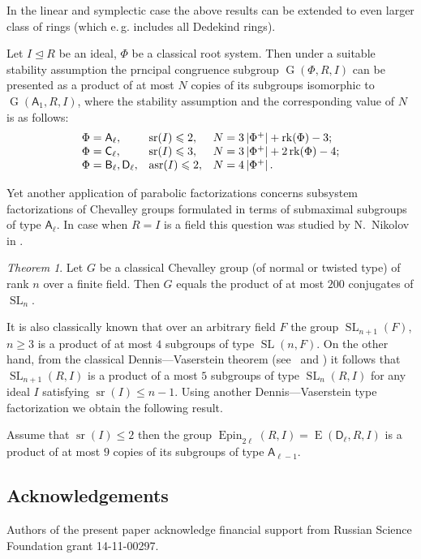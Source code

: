 \documentclass[12pt]{amsart}
\theoremstyle{plain} \declaretheorem[name=Theorem, Refname={Theorem,Theorems}]{thm} \Crefname{thm}{Theorem}{Theorems}
\numberwithin{equation}{section}
\theoremstyle{definition} \newtheorem{dfn}[lemma]{Definition} \Crefname{dfn}{Definition}{Definitions}
\theoremstyle{remark} \newtheorem{rem}[lemma]{Remark} \Crefname{rem}{Remark}{Remarks}
\newtheorem*{thm*}{Theorem}
\DeclareMathOperator{\G}{G}
\DeclareMathOperator{\SL}{SL}
\DeclareMathOperator{\E}{E}
\DeclareMathOperator{\sr}{sr}
\DeclareMathOperator{\Epin}{Epin}
\DeclareMathOperator{\asr}{asr}
\DeclareMathOperator{\rk}{rk}
\newcommand{\rA}{\mathsf{A}}
\newcommand{\rB}{\mathsf{B}}
\newcommand{\rC}{\mathsf{C}}
\newcommand{\rD}{\mathsf{D}}
\begin{document}
In the linear and symplectic case the above results can be extended to even larger class of rings (which e.\,g. includes all Dedekind rings).
\begin{thm}\label{thm:SL2width}
Let $I\trianglelefteq R$ be an ideal, $\Phi$ be a classical root system. Then under a suitable stability assumption the prncipal congruence subgroup $\G(\Phi,R,I)$ can be presented as a product of at most $N$ copies of its subgroups isomorphic to $\G(\rA_1,R,I)$, where the stability assumption and the corresponding value of $N$ is as follows:
\[\begin{array}{l@{\quad}l@{\quad}l}
\Phi=\rA_\ell, & \sr(I)\leqslant 2, & N=3\left|\Phi^+\right|+\rk(\Phi) - 3; \\
\Phi=\rC_\ell, & \sr(I)\leqslant 3, & N=3\left|\Phi^+\right|+2\rk(\Phi) - 4; \\
\Phi=\rB_\ell,\rD_\ell, & \asr(I)\leqslant 2, & N=4\left|\Phi^+\right|.
\end{array}\]
\end{thm}

Yet another application of parabolic factorizations concerns subsystem factorizations of Chevalley groups formulated in terms of submaximal subgroups of type $\rA_\ell$.
In case when $R=I$ is a field this question was studied by N.~Nikolov in \cite{NikProdDecomp}. 
\begin{thm*} Let $G$ be a classical Chevalley group (of normal or twisted type) of rank $n$ over a finite field.
Then $G$ equals the product of at most $200$ conjugates of $\SL_n$. \end{thm*}

It is also classically known that over an arbitrary field $F$ the group $\SL_{n+1}(F)$, $n\geq 3$ is a product of at most $4$ subgroups of type $\SL(n, F)$.
On the other hand, from the classical Dennis---Vaserstein theorem (see~\cite{Va69} and \cite[Lemma~2.1]{ST76})
it follows that $\SL_{n+1}(R, I)$ is a product of a most $5$ subgroups of type $\SL_n(R, I)$ for any ideal $I$ satisfying $\sr(I)\leqslant n-1$.
Using another Dennis---Vaserstein type factorization we obtain the following result.
\begin{thm}\label{thm:spin-sln-prod}
Assume that $\sr(I) \leqslant 2$ then the group $\Epin_{2\ell}(R, I)=\E(\rD_\ell, R, I)$ is a product of at most $9$ copies of its subgroups of type $\rA_{\ell-1}$.
\end{thm}

\subsection{Acknowledgements}
Authors of the present paper acknowledge financial support from Russian Science Foundation grant 14-11-00297.
\end{document}
